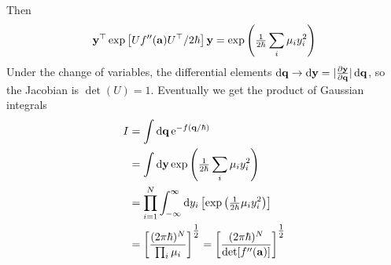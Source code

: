 \documentclass[10pt]{article}
\begin{document}
	Then
	\begin{equation}
		{\bf y}^\top \exp\left[Uf''({\bf a})U^\top/2\hbar\right] {\bf y} = \exp\left(\tfrac{1}{2\hbar} \sum_i \mu_i y_i^2\right)
	\end{equation}
	Under the change of variables, the differential elements $\mathop{}\!\mathrm{d} {\bf q} \to \mathop{}\!\mathrm{d} {\bf y} = |\tfrac{\partial {\bf y}}{\partial {\bf q}}| \mathop{}\!\mathrm{d} {\bf q}$, so the Jacobian is $\det(U) = 1$. Eventually we get the  product of Gaussian integrals
	\begin{align*}
		I &= \int \mathop{}\!\mathrm{d} {\bf q} \, {\mathrm{e}}^{-f({\bf q}/\hbar)}\\
		&= \int \mathop{}\!\mathrm{d} {\bf y} \exp\left(\tfrac{1}{2\hbar} \sum_i \mu_i y_i^2\right) \\
		&= \prod_{i=1}^N \int_{-\infty}^{\infty} \mathop{}\!\mathrm{d} y_i \left[ \exp\left(\tfrac{1}{2\hbar} \mu_i y_i^2\right) \right] \\
		&= \left[ \frac{(2\pi \hbar)^N}{\prod_i \mu_i} \right]^{\tfrac{1}{2}} = \left[ \frac{(2\pi \hbar)^N}{\det[f''({\bf a})]} \right]^{\tfrac{1}{2}}
	\end{align*}
\end{document}

